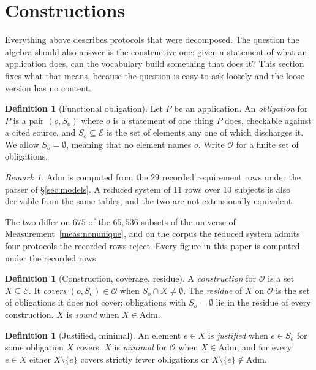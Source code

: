 \documentclass[11pt,reqno]{amsart}
\theoremstyle{plain}
\theoremstyle{definition}
\newtheorem{definition}[theorem]{Definition}
\theoremstyle{remark}
\newtheorem{remark}[theorem]{Remark}
\newcommand{\Admf}{\mathrm{Adm}}
\newcommand{\El}{\mathcal{E}}
\begin{document}
\section{Constructions}\label{sec:construct}

Everything above describes protocols that were decomposed. The question the
algebra should also answer is the constructive one: given a statement of what an
application does, can the vocabulary build something that does it? This section
fixes what that means, because the question is easy to ask loosely and the loose
version has no content.

\begin{definition}[Functional obligation]\label{def:obligation}
Let $P$ be an application. An \emph{obligation} for $P$ is a pair
$(o, S_{o})$ where $o$ is a statement of one thing $P$ does, checkable against a
cited source, and $S_{o} \subseteq \El$ is the set of elements any one of which
discharges it. We allow $S_{o} = \emptyset$, meaning that no element names $o$.
Write $\mathcal{O}$ for a finite set of obligations.
\end{definition}

\begin{remark}\label{rem:predicate}
$\Admf$ is computed from the $29$ recorded requirement rows under the parser of
\S\ref{sec:models}. A reduced system of $11$ rows over $10$ subjects is also
derivable from the same tables, and the two are not extensionally equivalent.
\end{remark}

The two differ on $675$ of the $65{,}536$ subsets of the universe of
Measurement~\ref{meas:nonunique}, and on the corpus the reduced system
admits four protocols the recorded rows reject. Every figure in this paper
is computed under the recorded rows.

\begin{definition}[Construction, coverage, residue]\label{def:construction}
A \emph{construction} for $\mathcal{O}$ is a set $X \subseteq \El$. It
\emph{covers} $(o,S_{o}) \in \mathcal{O}$ when $S_{o} \cap X \neq \emptyset$. The
\emph{residue} of $X$ on $\mathcal{O}$ is the set of obligations it does not
cover; obligations with $S_{o} = \emptyset$ lie in the residue of every
construction. $X$ is \emph{sound} when $X \in \Admf$.
\end{definition}

\begin{definition}[Justified, minimal]\label{def:minimal}
An element $e \in X$ is \emph{justified} when $e \in S_{o}$ for some obligation
$X$ covers. $X$ is \emph{minimal} for $\mathcal{O}$ when $X \in \Admf$, and for
every
$e \in X$ either $X \setminus \{e\}$ covers strictly fewer obligations or
$X \setminus \{e\} \notin \Admf$.
\end{definition}
\end{document}
